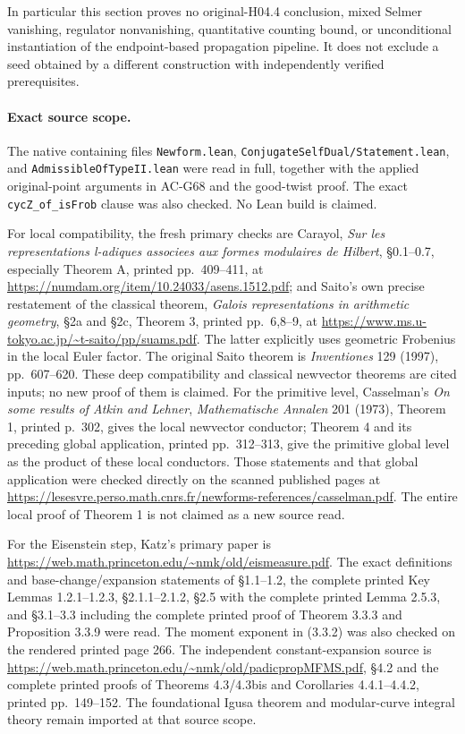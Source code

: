 In particular this section proves no original-H04.4 conclusion,
mixed Selmer vanishing, regulator nonvanishing, quantitative
counting bound, or unconditional instantiation of the endpoint-based
propagation pipeline.  It does not exclude a seed obtained by a
different construction with independently verified prerequisites.

\paragraph{Exact source scope.}
The native containing files \texttt{Newform.lean},
\texttt{ConjugateSelfDual/Statement.lean}, and
\texttt{AdmissibleOfTypeII.lean} were read in full, together
with the applied original-point arguments in AC-G68 and the
good-twist proof.  The exact \texttt{cycZ\_of\_isFrob} clause
was also checked.  No Lean build is claimed.

For local compatibility, the fresh primary checks are
Carayol, \emph{Sur les representations l-adiques associees
aux formes modulaires de Hilbert}, \S0.1--0.7, especially
Theorem A, printed pp.~409--411, at
\url{https://numdam.org/item/10.24033/asens.1512.pdf};
and Saito's own precise restatement of the classical theorem,
\emph{Galois representations in arithmetic geometry},
\S2a and \S2c, Theorem 3, printed pp.~6,8--9, at
\url{https://www.ms.u-tokyo.ac.jp/~t-saito/pp/suams.pdf}.
The latter explicitly uses geometric Frobenius in the local
Euler factor.  The original Saito theorem is
\emph{Inventiones} 129 (1997), pp.~607--620.
These deep compatibility and classical newvector theorems
are cited inputs; no new proof of them is claimed.
For the primitive level, Casselman's \emph{On some results of
Atkin and Lehner}, \emph{Mathematische Annalen} 201 (1973),
Theorem 1, printed p.~302, gives the local newvector conductor;
Theorem 4 and its preceding global application, printed
pp.~312--313, give the primitive global level as the product of
these local conductors.  Those statements and that global
application were checked directly on the scanned published pages
at \url{https://lesesvre.perso.math.cnrs.fr/newforms-references/casselman.pdf}.
The entire local proof of Theorem 1 is not claimed as a new source read.

For the Eisenstein step, Katz's primary paper is
\url{https://web.math.princeton.edu/~nmk/old/eismeasure.pdf}.
The exact definitions and base-change/expansion statements of
\S1.1--1.2, the complete printed Key Lemmas 1.2.1--1.2.3,
\S2.1.1--2.1.2, \S2.5 with the complete printed Lemma 2.5.3,
and \S3.1--3.3 including the complete printed proof of
Theorem 3.3.3 and Proposition 3.3.9 were read.
The moment exponent in (3.3.2) was also checked on the
rendered printed page 266.  The independent constant-expansion
source is
\url{https://web.math.princeton.edu/~nmk/old/padicpropMFMS.pdf},
\S4.2 and the complete printed proofs of Theorems 4.3/4.3bis
and Corollaries 4.4.1--4.4.2, printed pp.~149--152.
The foundational Igusa theorem and modular-curve integral
theory remain imported at that source scope.


